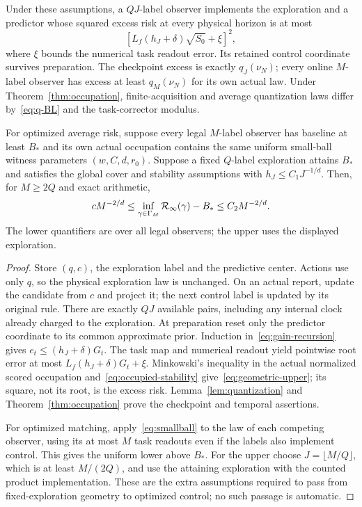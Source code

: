 \begin{theorem}\label{thm:geometry}
Under these assumptions, a $QJ$-label observer implements the exploration and a predictor whose squared excess risk at every physical horizon is at most
\begin{equation}\label{eq:geometric-upper}
 \left[L_f(h_J+\delta)\sqrt{S_0}+\xi\right]^2,
\end{equation}
where $\xi$ bounds the numerical task readout error. Its retained control coordinate survives preparation. The checkpoint excess is exactly $q_J(\nu_N)$; every online $M$-label observer has excess at least $q_M(\nu_N)$ for its own actual law. Under Theorem~\ref{thm:occupation}, finite-acquisition and average quantization laws differ by~\eqref{eq:q-BL} and the task-corrector modulus.

For optimized average risk, suppose every legal $M$-label observer has baseline at least $B_*$ and its own actual occupation contains the same uniform small-ball witness parameters $(w,C,d,r_0)$. Suppose a fixed $Q$-label exploration attains $B_*$ and satisfies the global cover and stability assumptions with $h_J\le C_1J^{-1/d}$. Then, for $M\ge2Q$ and exact arithmetic,
\begin{equation}\label{eq:optimized-geometry}
 cM^{-2/d}\le\inf_{\gamma\in\Gamma_M}\mathcal R_\infty(\gamma)-B_*
 \le C_2M^{-2/d}.
\end{equation}
The lower quantifiers are over all legal observers; the upper uses the displayed exploration.
\end{theorem}
\begin{proof}
Store $(q,c)$, the exploration label and the predictive center. Actions use only $q$, so the physical exploration law is unchanged. On an actual report, update the candidate from $c$ and project it; the next control label is updated by its original rule. There are exactly $QJ$ available pairs, including any internal clock already charged to the exploration. At preparation reset only the predictor coordinate to its common approximate prior. Induction in~\eqref{eq:gain-recursion} gives $e_t\le(h_J+\delta)G_t$. The task map and numerical readout yield pointwise root error at most $L_f(h_J+\delta)G_t+\xi$. Minkowski's inequality in the actual normalized scored occupation and~\eqref{eq:occupied-stability} give~\eqref{eq:geometric-upper}; its square, not its root, is the excess risk. Lemma~\ref{lem:quantization} and Theorem~\ref{thm:occupation} prove the checkpoint and temporal assertions.

For optimized matching, apply~\eqref{eq:smallball} to the law of each competing observer, using its at most $M$ task readouts even if the labels also implement control. This gives the uniform lower above $B_*$. For the upper choose $J=\lfloor M/Q\rfloor$, which is at least $M/(2Q)$, and use the attaining exploration with the counted product implementation. These are the extra assumptions required to pass from fixed-exploration geometry to optimized control; no such passage is automatic.
\end{proof}

